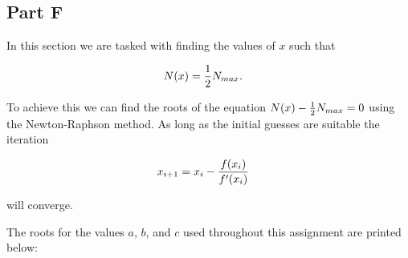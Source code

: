 \subsection{Part F}

In this section we are tasked with finding the values of $x$ such that

\begin{align}
N(x) &= {1\over 2} N_{max}.
\end{align}

To achieve this we can find the roots of the equation $N(x) - {1\over 2}N_{max} = 0$ using the Newton-Raphson method. As long as the initial guesses are suitable the iteration

\begin{align}
x_{i+1} &= x_{i} - {f(x_{i}) \over f'(x_{i})}
\end{align}

will converge.



The roots for the values $a$, $b$, and $c$ used throughout this assignment are printed below:


